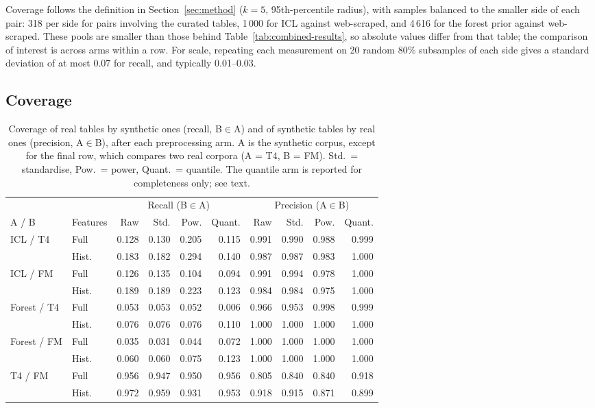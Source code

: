 \documentclass{article}
\begin{document}
Coverage follows the definition in Section~\ref{sec:method} ($k = 5$, 95th-percentile radius), with samples balanced to the smaller side of each pair: 318 per side for pairs involving the curated tables, 1\,000 for ICL against web-scraped, and 4\,616 for the forest prior against web-scraped.
These pools are smaller than those behind Table~\ref{tab:combined-results}, so absolute values differ from that table; the comparison of interest is across arms within a row.
For scale, repeating each measurement on 20 random 80\% subsamples of each side gives a standard deviation of at most 0.07 for recall, and typically 0.01--0.03.

\subsection{Coverage}

\begin{table}[ht]
\centering
\caption{Coverage of real tables by synthetic ones (recall, B$\in$A) and of synthetic tables by real ones (precision, A$\in$B), after each preprocessing arm. A is the synthetic corpus, except for the final row, which compares two real corpora (A = T4, B = FM). Std.\ = standardise, Pow.\ = power, Quant.\ = quantile. The quantile arm is reported for completeness only; see text.}
\label{tab:preprocessing-coverage}
\small
\begin{tabular}{ll rrrr rrrr}
\toprule
 & & \multicolumn{4}{c}{Recall (B$\in$A)} & \multicolumn{4}{c}{Precision (A$\in$B)} \\
\cmidrule(lr){3-6} \cmidrule(lr){7-10}
A / B & Features & Raw & Std. & Pow. & Quant. & Raw & Std. & Pow. & Quant. \\
\midrule
ICL / T4      & Full & 0.128 & 0.130 & 0.205 & 0.115 & 0.991 & 0.990 & 0.988 & 0.999 \\
              & Hist.\ & 0.183 & 0.182 & 0.294 & 0.140 & 0.987 & 0.987 & 0.983 & 1.000 \\
ICL / FM      & Full & 0.126 & 0.135 & 0.104 & 0.094 & 0.991 & 0.994 & 0.978 & 1.000 \\
              & Hist.\ & 0.189 & 0.189 & 0.223 & 0.123 & 0.984 & 0.984 & 0.975 & 1.000 \\
Forest / T4   & Full & 0.053 & 0.053 & 0.052 & 0.006 & 0.966 & 0.953 & 0.998 & 0.999 \\
              & Hist.\ & 0.076 & 0.076 & 0.076 & 0.110 & 1.000 & 1.000 & 1.000 & 1.000 \\
Forest / FM   & Full & 0.035 & 0.031 & 0.044 & 0.072 & 1.000 & 1.000 & 1.000 & 1.000 \\
              & Hist.\ & 0.060 & 0.060 & 0.075 & 0.123 & 1.000 & 1.000 & 1.000 & 1.000 \\
\midrule
T4 / FM       & Full & 0.956 & 0.947 & 0.950 & 0.956 & 0.805 & 0.840 & 0.840 & 0.918 \\
              & Hist.\ & 0.972 & 0.959 & 0.931 & 0.953 & 0.918 & 0.915 & 0.871 & 0.899 \\
\bottomrule
\end{tabular}
\end{table}
\end{document}
